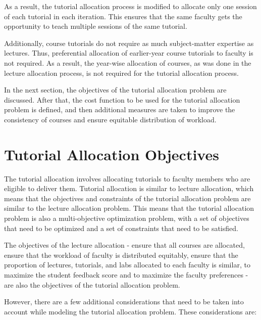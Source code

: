 As a result, the tutorial allocation process is modified to allocate only one session of each tutorial in each iteration. This ensures that the same faculty gets the opportunity to teach multiple sessions of the same tutorial.

Additionally, course tutorials do not require as much subject-matter expertise as lectures. Thus, preferential allocation of earlier-year course tutorials to faculty is not required. As a result, the year-wise allocation of courses, as was done in the lecture allocation process, is not required for the tutorial allocation process.

In the next section, the objectives of the tutorial allocation problem are discussed. After that, the cost function to be used for the tutorial allocation problem is defined, and then additional measures are taken to improve the consistency of courses and ensure equitable distribution of workload.

\section{Tutorial Allocation Objectives}

The tutorial allocation involves allocating tutorials to faculty members who are eligible to deliver them. Tutorial allocation is similar to lecture allocation, which means that the objectives and constraints of the tutorial allocation problem are similar to the lecture allocation problem. This means that the tutorial allocation problem is also a multi-objective optimization problem, with a set of objectives that need to be optimized and a set of constraints that need to be satisfied.

The objectives of the lecture allocation - ensure that all courses are allocated, ensure that the workload of faculty is distributed equitably, ensure that the proportion of lectures, tutorials, and labs allocated to each faculty is similar, to maximize the student feedback score and to maximize the faculty preferences - are also the objectives of the tutorial allocation problem.

However, there are a few additional considerations that need to be taken into account while modeling the tutorial allocation problem. These considerations are:

